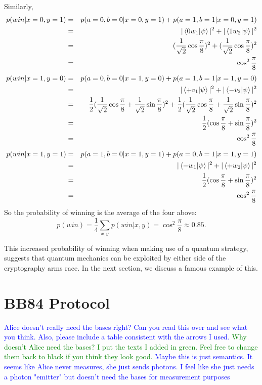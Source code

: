 Similarly,
\begin{eqnarray*}
p(win|x=0,y=1)&=&p(a=0, b=0|x=0, y=1)+p(a=1, b=1|x=0, y=1)\\
&=&|\braket{0 w_1|\psi}|^2 + |\braket{1 w_2|\psi}|^2\\
&=&(\frac{1}{\sqrt{2}}\cos\frac{\pi}{8})^2+(\frac{1}{\sqrt{2}}\cos\frac{\pi}{8})^2\\
&=&\cos^2 \frac{\pi}{8}
\end{eqnarray*}
\begin{eqnarray*}
p(win|x=1,y=0)&=&p(a=0, b=0|x=1, y=0)+p(a=1, b=1|x=1, y=0)\\
&=&|\braket{+ v_1|\psi}|^2 + |\braket{- v_2|\psi}|^2\\
&=&\frac{1}{2}(\frac{1}{\sqrt{2}}\cos\frac{\pi}{8}+\frac{1}{\sqrt{2}}\sin\frac{\pi}{8})^2+\frac{1}{2}(\frac{1}{\sqrt{2}}\cos\frac{\pi}{8}+\frac{1}{\sqrt{2}}\sin\frac{\pi}{8})^2\\
&=&\frac{1}{2}(\cos\frac{\pi}{8}+\sin\frac{\pi}{8})^2\\
&=&\cos^2 \frac{\pi}{8}
\end{eqnarray*}
\begin{eqnarray*}
p(win|x=1,y=1)&=&p(a=1, b=0|x=1, y=1)+p(a=0, b=1|x=1, y=1)\\
&=&|\braket{- w_1|\psi}|^2 + |\braket{+ w_2|\psi}|^2\\
&=&\frac{1}{2}(\cos\frac{\pi}{8}+\sin\frac{\pi}{8})^2\\
&=&\cos^2 \frac{\pi}{8}
\end{eqnarray*}
So the probability of winning is the average of the four above:
\begin{equation*}
    p(win)=\frac{1}{4}\sum_{x,y}p(win|x,y)=\cos^2 \frac{\pi}{8} \approx 0.85.
\end{equation*}


This increased probability of winning when making use of a quantum strategy, suggests that quantum mechanics can be exploited by either side of the cryptography arms race.  In the next section, we discuss a famous example of this.




\pagebreak

\section{BB84 Protocol}
\textcolor{blue}{Alice doesn't really need the bases right?  Can you read this over and see what you think.  Also, please include a table consistent with the arrows I used.} \textcolor{green}{Why doesn't Alice need the bases? I put the texts I added in green. Feel free to change them back to black if you think they look good.}
\textcolor{blue}{Maybe this is just semantics.  It seems like Alice never measures, she just sends photons.  I feel like she just needs a photon "emitter" but doesn't need the bases for measurement purposes}

